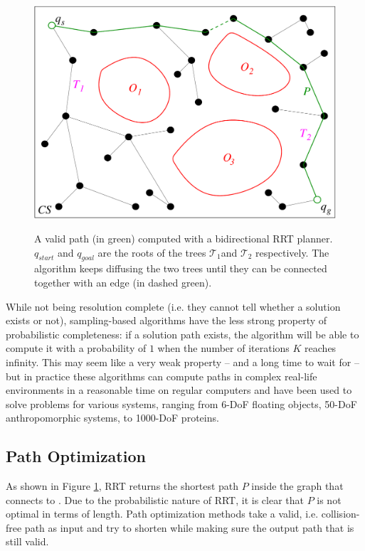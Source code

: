 \begin{figure}
  \centering
      {\includegraphics[width = 0.8\linewidth]
        {src/chap1-path-optimization/rrt.pdf}}
      \caption{A valid path (in green) computed with a bidirectional
        RRT planner. $q_{start}$ and $q_{goal}$ are the roots of the
        trees $\mathcal{T}_{1}$and $\mathcal{T}_{2}$ respectively. The
        algorithm keeps diffusing the two trees until they can be
        connected together with an edge (in dashed green).}
      \label{fig:chap1-rrt}
\end{figure}

While not being resolution complete (i.e. they cannot tell whether a
solution exists or not), sampling-based algorithms have the less
strong property of probabilistic completeness: if a solution path
exists, the algorithm will be able to compute it with a probability of
$1$ when the number of iterations $K$ reaches infinity. This may seem
like a very weak property -- and a long time to wait for -- but in
practice these algorithms can compute paths in complex real-life
environments in a reasonable time on regular computers and have been
used to solve problems for various systems, ranging from 6-DoF
floating objects, 50-DoF anthropomorphic systems, to 1000-DoF
proteins.

\subsection{Path Optimization}
\label{subsec:chap1-path-optimization}

As shown in Figure \ref{fig:chap1-rrt}, RRT returns the shortest path
$P$ inside the graph that connects  to . Due to
the probabilistic nature of RRT, it is clear that $P$ is not optimal
in terms of length. Path optimization methods take a valid,
i.e. collision-free path as input and try to shorten while making sure
the output path that is still valid.

